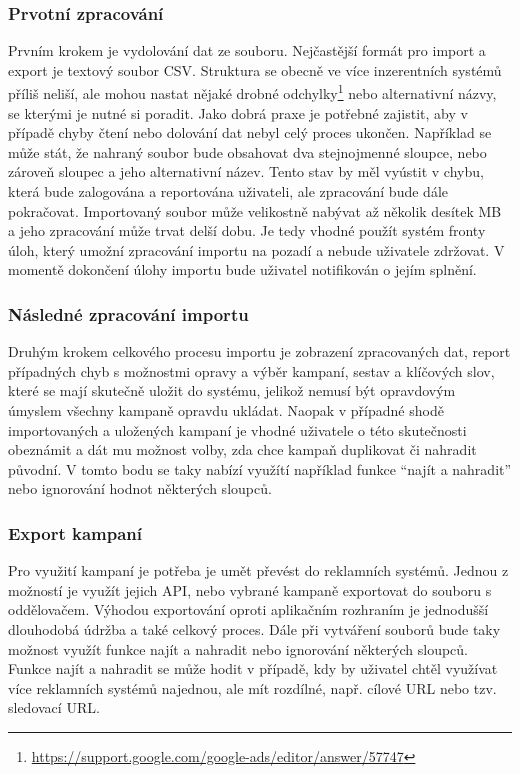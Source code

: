 \subsubsection{Prvotní zpracování}
Prvním krokem je vydolování dat ze souboru. Nejčastější formát pro import a export je textový soubor CSV. Struktura se obecně ve více inzerentních
systémů příliš neliší, ale mohou nastat nějaké drobné odchylky\footnote{\href{https://support.google.com/google-ads/editor/answer/57747}{https://support.google.com/google-ads/editor/answer/57747}}
nebo alternativní názvy, se kterými je nutné si poradit. Jako dobrá praxe je potřebné zajistit, aby v případě chyby čtení nebo dolování dat nebyl celý
proces ukončen. Například se může stát, že nahraný soubor bude obsahovat dva stejnojmenné sloupce, nebo zároveň sloupec a jeho alternativní název.\cite{google:csv} Tento
stav by měl vyústit v chybu, která bude zalogována a reportována uživateli, ale zpracování bude dále pokračovat. 
Importovaný soubor může velikostně nabývat až několik desítek MB a jeho zpracování může trvat delší
dobu. Je tedy vhodné použít systém fronty úloh, který umožní zpracování importu na pozadí a nebude uživatele zdržovat. V momentě dokončení úlohy importu
bude uživatel notifikován o jejím splnění.

\subsubsection{Následné zpracování importu}
Druhým krokem celkového procesu importu je zobrazení zpracovaných dat, report případných chyb s možnostmi opravy a výběr kampaní, sestav a klíčových slov,
které se mají skutečně uložit do systému, jelikož nemusí být opravdovým úmyslem všechny kampaně opravdu ukládat.
Naopak v případné shodě importovaných a uložených kampaní je vhodné uživatele o této skutečnosti
obeznámit a dát mu možnost volby, zda chce kampaň duplikovat či nahradit původní. 
V tomto bodu se taky nabízí využítí například funkce \enquote{najít a nahradit} nebo ignorování hodnot některých sloupců.

\subsubsection{Export kampaní}
Pro využití kampaní je potřeba je umět převést do reklamních systémů. Jednou z možností je využít jejich API, nebo vybrané kampaně exportovat do souboru
s oddělovačem. Výhodou exportování oproti aplikačním rozhraním je jednodušší dlouhodobá údržba a také celkový proces. Dále při vytváření souborů
bude taky možnost využít funkce najít a nahradit nebo ignorování některých sloupců. Funkce najít a nahradit se může hodit v případě, kdy by uživatel chtěl využívat
více reklamních systémů najednou, ale mít rozdílné, např. cílové URL nebo tzv. sledovací URL.

